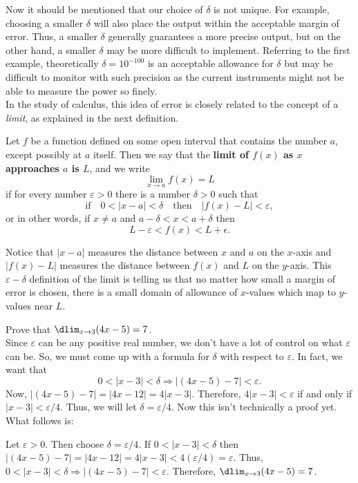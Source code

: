 \documentclass{book}
\begin{document}
Now it should be mentioned that our choice of $\delta$ is not unique. For example, choosing a smaller $\delta$ will also place the output within the acceptable margin of error. Thus, a smaller $\delta$ generally guarantees a more precise output, but on the other hand, a smaller $\delta$ may be more difficult to implement. Referring to the first example, theoretically $\delta = 10^{-100}$ is an acceptable allowance for $\delta$ but may be difficult to monitor with such precision as the current instruments might not be able to measure the power so finely. \\

In the study of calculus, this idea of error is closely related to the concept of a \emph{limit}, as explained in the next definition. 

\begin{Def} Let $f$ be a function defined on some open interval that contains the number $a$, except possibly at $a$ itself. Then we say that the \textbf{limit of $f(x)$ as $x$ approaches $a$ is $L$}, and we write \[\lim_{x\to a} f(x) = L\] if for every number $\varepsilon > 0$ there is a number $\delta > 0$ such that 
\[\text{if}\quad 0< |x-a| < \delta \quad\text{then}\quad |f(x) - L | < \varepsilon,\] or in other words, if $x\neq a$ and $a-\delta < x < a+\delta$ then \[L-\varepsilon < f(x) < L+\epsilon.\]
\end{Def}\vs

Notice that $|x-a|$ measures the distance between $x$ and $a$ on the $x$-axis and $|f(x)  - L|$ measures the distance between $f(x)$ and $L$ on the $y$-axis. This $\varepsilon-\delta$ definition of the limit is telling us that no matter how small a margin of error is chosen, there is a small domain of allowance of $x$-values which map to $y$-values near $L$. 

\begin{Exam} Prove that $\dlim_{x\to 3} (4x-5) = 7$. \\

Since $\varepsilon$ can be any positive real number, we don't have a lot of control on what $\varepsilon$ can be. So, we must come up with a formula for $\delta$ with respect to $\varepsilon$. In fact, we want that \[0< | x-3| < \delta \Longrightarrow |(4x-5) - 7| < \varepsilon.\] Now, $|(4x-5) - 7| = |4x-12| = 4|x-3|$. Therefore, $4|x-3| < \varepsilon$ if and only if $|x-3| < \varepsilon/4$. Thus, we will let $\delta = \varepsilon /4$. Now this isn't technically a proof yet. What follows is:%
\begin{pf}
Let $\varepsilon > 0$. Then choose $\delta = \varepsilon/4$. If $0< |x-3| < \delta$ then 
$|(4x-5) - 7| = |4x-12| = 4|x-3| < 4(\varepsilon/4) = \varepsilon.$ Thus, $0<|x-3|<\delta \Longrightarrow |(4x-5) - 7| < \varepsilon.$ Therefore, $\dlim_{x\to 3} (4x-5) = 7$. 
\end{pf}
\end{Exam}
\end{document}
